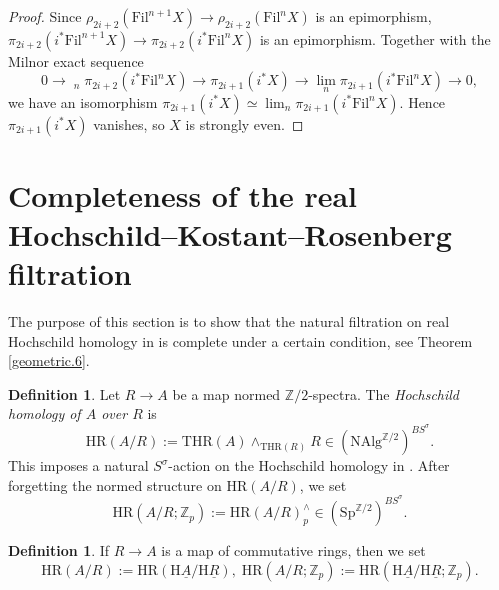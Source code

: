 \documentclass[10pt]{amsart}
\theoremstyle{definition}
\newtheorem{df}[thm]{Definition}
\numberwithin{equation}{section}
\newcommand{\Z}{\mathbb{Z}}
\newcommand{\rH}{\mathrm{H}}
\newcommand{\ul}{\underline}
\newcommand{\NAlg}{\mathrm{NAlg}}
\newcommand{\Sp}{\mathrm{Sp}}
\newcommand{\Fil}{\mathrm{Fil}}
\newcommand{\HR}{\mathrm{HR}}
\newcommand{\THR}{\mathrm{THR}}
\begin{document}
{\begin{proof}
Since $\rho_{2i+2}(\Fil^{n+1}X)\to \rho_{2i+2}(\Fil^n X)$ is an epimorphism,
$\pi_{2i+2}(i^*\Fil^{n+1}X)\to \pi_{2i+2}(i^*\Fil^n X)$ is an epimorphism.
Together with the Milnor exact sequence
\[
0
\to
\mathop{\mathrm{lim}^1}_n \pi_{2i+2} (i^*\Fil^n X)
\to
\pi_{2i+1} (i^*X)
\to
\lim_n \pi_{2i+1} (i^*\Fil^n X)
\to
0,
\]
we have an isomorphism $\pi_{2i+1} (i^*X)\simeq \lim_n \pi_{2i+1} (i^*\Fil^n X)$.
Hence $\pi_{2i+1}(i^*X)$ vanishes,
so $X$ is strongly even.
\end{proof}






\section{Completeness of the real Hochschild--Kostant--Rosenberg filtration}




The purpose of this section is to show that the natural filtration on real Hochschild homology in \cite[Theorem 4.32]{HP} is complete under a certain condition, see Theorem \ref{geometric.6}.

\begin{df}
Let $R\to A$ be a map normed $\Z/2$-spectra.
The \emph{Hochschild homology of $A$ over $R$} is
\[
\HR(A/R)
:=
\THR(A)\wedge_{\THR(R)}R
\in
(\NAlg^{\Z/2})^{B S^\sigma}.
\]
This imposes a natural $S^\sigma$-action on the Hochschild homology in \cite[Definition 4.1]{HP}.
After forgetting the normed structure on $\HR(A/R)$,
we set
\[
\HR(A/R;\Z_p):=\HR(A/R)_p^\wedge
\in
(\Sp^{\Z/2})^{BS^\sigma}.
\]
\end{df}

\begin{df}
If $R\to A$ is a map of commutative rings,
then we set
\[
\HR(A/R)
:=
\HR(\rH \ul{A}/\rH \ul{R}),
\;
\HR(A/R;\Z_p)
:=
\HR(\rH \ul{A}/\rH \ul{R};\Z_p).
\]
\end{df}

}
\end{document}

